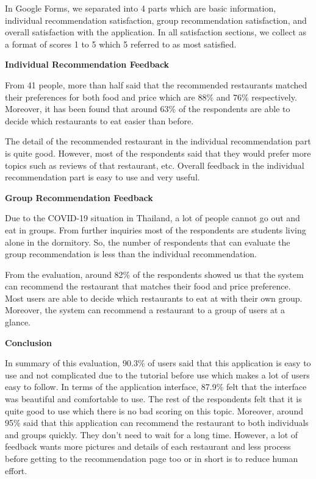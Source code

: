 \documentclass[12pt,oneside,openright,a4paper]{cpe-english-project}
\begin{document}
In Google Forms, we separated into 4 parts which are basic information, individual recommendation satisfaction, group recommendation satisfaction, and overall satisfaction with the application.  In all satisfaction sections, we collect as a format of scores 1 to 5 which 5 referred to as most satisfied.

\textbf{Individual Recommendation Feedback}\par

From 41 people, more than half said that the recommended restaurants matched their preferences for both food and price which are 88\% and 76\% respectively. Moreover, it has been found that around 63\% of the respondents are able to decide which restaurants to eat easier than before.

The detail of the recommended restaurant in the individual recommendation part is quite good. However, most of the respondents said that they would prefer more topics such as reviews of that restaurant, etc. Overall feedback in the individual recommendation part is easy to use and very useful.

\textbf{Group Recommendation Feedback}\par

Due to the COVID-19 situation in Thailand, a lot of people cannot go out and eat in groups. From further inquiries most of the respondents are students living alone in the dormitory. So, the number of respondents that can evaluate the group recommendation is less than the individual recommendation.

From the evaluation, around 82\% of the respondents showed us that the system can recommend the restaurant that matches their food and price preference. Most users are able to decide which restaurants to eat at with their own group. Moreover, the system can recommend a restaurant to a group of users at a glance.

\textbf{Conclusion}\par

In summary of this evaluation, 90.3\% of users said that this application is easy to use and not complicated due to the tutorial before use which makes a lot of users easy to follow. In terms of the application interface, 87.9\% felt that the interface was beautiful and comfortable to use. The rest of the respondents felt that it is quite good to use which there is no bad scoring on this topic. Moreover, around 95\% said that this application can recommend the restaurant to both individuals and groups quickly. They don't need to wait for a long time. However, a lot of feedback wants more pictures and details of each restaurant and less process before getting to the recommendation page too or in short is to reduce human effort.
\end{document}
